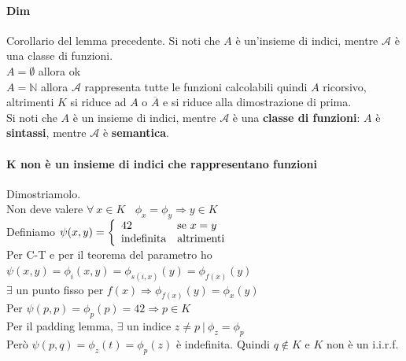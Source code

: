 \documentclass[10pt]{book}
\begin{document}
\paragraph{Dim} Corollario del lemma precedente. Si noti che $A$ è un'insieme di indici, mentre $\mathscr{A}$ è una classe di funzioni.\\
$A = \emptyset$ allora ok\\
$A = \mathbb{N}$ allora $\mathscr{A}$ rappresenta tutte le funzioni calcolabili quindi $A$ ricorsivo, altrimenti $K$ si riduce ad $A$ o $\overline{A}$ e si riduce alla dimostrazione di prima.\\
Si noti che $A$ è un insieme di indici, mentre $\mathscr{A}$ è una \textbf{classe di funzioni}: $A$ è \textbf{sintassi}, mentre $\mathscr{A}$ è \textbf{semantica}.
\pagebreak
\paragraph{K non è un insieme di indici che rappresentano funzioni} Dimostriamolo.\\ Non deve valere $\forall\:x\in K\:\:\:\:\phi_x = \phi_y \Rightarrow y \in K$\\
Definiamo $\psi(x, y) = \left\{\begin{array}{l l}
	42 & \text{se }x = y\\
	\text{indefinita} & \text{altrimenti}
\end{array} \right.$\\Per C-T e per il teorema del parametro ho $\psi(x, y) = \phi_i(x, y) = \phi_{s(i,x)}(y) = \phi_{f(x)}(y)$\\
$\exists$ un punto fisso per $f(x) \Rightarrow \phi_{f(x)}(y) = \phi_x(y)$\\
Per $\psi(p,p) = \phi_p(p) = 42 \Rightarrow p\in K$\\
Per il padding lemma, $\exists$ un indice $z \neq p\:|\:\phi_z = \phi_p$\\
Però $\psi(p,q) = \phi_z(t) = \phi_p(z)$ è indefinita. Quindi $q\not\in K$ e $K$ non è un i.i.r.f.
\end{document}

